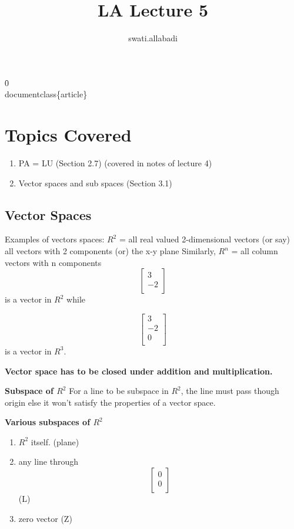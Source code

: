 \f0\fs24 \cf0 \\documentclass\{article\}\
\title{LA Lecture 5}
\author{swati.allabadi }
\begin{document}
\maketitle

\section{Topics Covered}
\begin{enumerate}
    \item  PA = LU (Section 2.7) (covered in notes of lecture 4)
    \item  Vector spaces and sub spaces (Section 3.1) 
\end{enumerate}

\subsection{Vector Spaces}
Examples of vectors spaces: \newline
$R^2$ = all real valued 2-dimensional vectors (or say) all vectors with 2 components (or)  the x-y plane \newline
Similarly, $R^n$ = all column vectors with n components
\[
\begin{bmatrix}
3 \\
-2\\
\end{bmatrix}
\] is a vector in $R^2$ while 

\[
\begin{bmatrix}
3 \\
-2\\
0\\
\end{bmatrix}
\] is a vector in $R^3$.

\textbf{Vector space has to be closed under addition and multiplication.}

\textbf{Subspace of $R^2$} %
For a line to be subspace in $R^2$, the line must pass though origin else it won't satisfy the properties of a vector space.

\newline
\textbf{Various subspaces of $R^2$}
\begin{enumerate}
    \item $R^2$ itself. (plane)
    \item any line through \[
\begin{bmatrix}
0\\
0\\
\end{bmatrix}
\] (L)
    \item zero vector (Z)
\end{enumerate}
\end{document}

